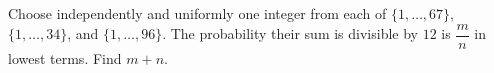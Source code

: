 Choose independently and uniformly one integer from each of $\{1,\ldots,67\}$, $\{1,\ldots,34\}$, and $\{1,\ldots,96\}$. The probability their sum is divisible by $12$ is $\dfrac{m}{n}$ in lowest terms. Find $m+n$.
